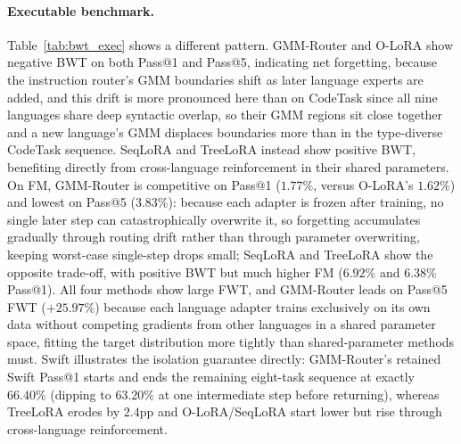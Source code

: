 \paragraph{Executable benchmark.} Table~\ref{tab:bwt_exec} shows a different pattern. GMM-Router and O-LoRA show negative BWT on both Pass@1 and Pass@5, indicating net forgetting, because the instruction router's GMM boundaries shift as later language experts are added, and this drift is more pronounced here than on CodeTask since all nine languages share deep syntactic overlap, so their GMM regions sit close together and a new language's GMM displaces boundaries more than in the type-diverse CodeTask sequence. SeqLoRA and TreeLoRA instead show positive BWT, benefiting directly from cross-language reinforcement in their shared parameters. On FM, GMM-Router is competitive on Pass@1 ($1.77\%$, versus O-LoRA's $1.62\%$) and lowest on Pass@5 ($3.83\%$): because each adapter is frozen after training, no single later step can catastrophically overwrite it, so forgetting accumulates gradually through routing drift rather than through parameter overwriting, keeping worst-case single-step drops small; SeqLoRA and TreeLoRA show the opposite trade-off, with positive BWT but much higher FM ($6.92\%$ and $6.38\%$ Pass@1). All four methods show large FWT, and GMM-Router leads on Pass@5 FWT ($+25.97\%$) because each language adapter trains exclusively on its own data without competing gradients from other languages in a shared parameter space, fitting the target distribution more tightly than shared-parameter methods must. Swift illustrates the isolation guarantee directly: GMM-Router's retained Swift Pass@1 starts and ends the remaining eight-task sequence at exactly $66.40\%$ (dipping to $63.20\%$ at one intermediate step before returning), whereas TreeLoRA erodes by $2.4$pp and O-LoRA/SeqLoRA start lower but rise through cross-language reinforcement.

\begin{table}[t]
\centering
\caption{BWT, FM, and FWT (\%) on the executable benchmark. Positive BWT indicates backward enhancement; lower FM is better; higher FWT indicates stronger in-task learning.}
\label{tab:bwt_exec}
\scriptsize
{}
\end{table}

